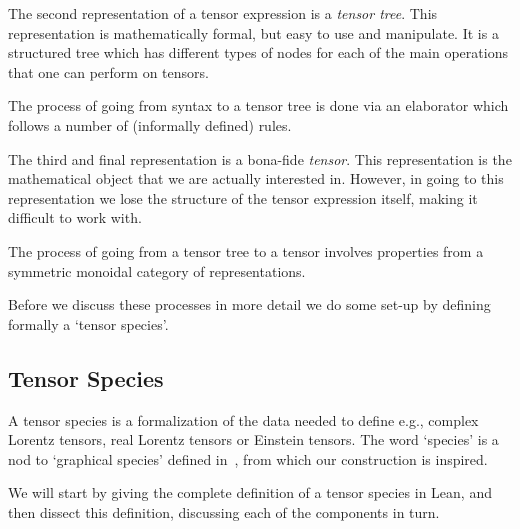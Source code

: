 \documentclass[a4paper, 11pt]{article}
\begin{document}
The second representation of a tensor expression is a \emph{tensor tree}. This representation is 
mathematically formal, but easy to use and manipulate. 
It is a structured tree which has different types 
of nodes for each of the main operations that one can perform on tensors.

The process of going from syntax to a tensor tree is done via an elaborator 
which follows a number of (informally defined) rules.

The third and final representation is a bona-fide \emph{tensor}. This representation 
is the mathematical object that we are actually interested in. However, in going to this representation
we lose the structure of the tensor expression itself, making it difficult to work with. 

The process of going from a tensor tree to a tensor involves properties from a symmetric monoidal 
category of representations. 

Before we discuss these processes in more detail we do some set-up by defining formally a 
`tensor species'. 

\subsection{Tensor Species}

A tensor species is a formalization of the data needed to define e.g., complex Lorentz tensors, 
real Lorentz tensors or Einstein tensors. The word `species' is a nod to `graphical species'
defined in~\cite{JOYAL2011105,raynor2021graphical}, from which our construction is inspired.

We will start by giving the complete definition of a tensor species in Lean, and then 
dissect this definition, discussing each of the components in turn. 
\end{document}
